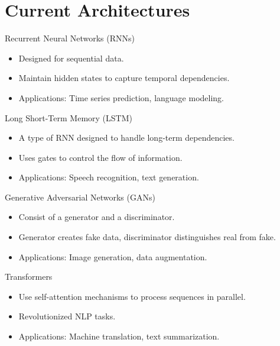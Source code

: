 \documentclass{beamer}
\begin{document}
\section{Current Architectures}
\begin{frame}{Recurrent Neural Networks (RNNs)}
    \begin{itemize}
        \item Designed for sequential data.
        \item Maintain hidden states to capture temporal dependencies.
        \item Applications: Time series prediction, language modeling.
    \end{itemize}
\end{frame}

\begin{frame}{Long Short-Term Memory (LSTM)}
    \begin{itemize}
        \item A type of RNN designed to handle long-term dependencies.
        \item Uses gates to control the flow of information.
        \item Applications: Speech recognition, text generation.
    \end{itemize}
\end{frame}

\begin{frame}{Generative Adversarial Networks (GANs)}
    \begin{itemize}
        \item Consist of a generator and a discriminator.
        \item Generator creates fake data, discriminator distinguishes real from fake.
        \item Applications: Image generation, data augmentation.
    \end{itemize}
\end{frame}

\begin{frame}{Transformers}
    \begin{itemize}
        \item Use self-attention mechanisms to process sequences in parallel.
        \item Revolutionized NLP tasks.
        \item Applications: Machine translation, text summarization.
    \end{itemize}
\end{frame}
\end{document}
